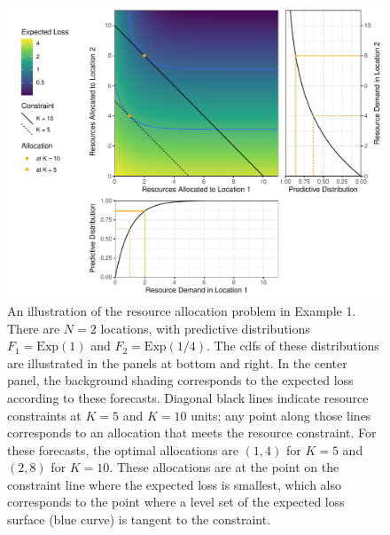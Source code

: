 \documentclass{article}
\begin{document}
\begin{figure}
    \includegraphics[width=\textwidth]{../figures/exponential_pred_expected_loss.pdf}
    \caption{An illustration of the resource allocation problem in Example 1. There are $N = 2$ locations, with predictive distributions $F_1 = \mathrm{Exp}(1)$ and $F_2 = \mathrm{Exp}(1/4)$. The cdfs of these distributions are illustrated in the panels at bottom and right. In the center panel, the background shading corresponds to the expected loss according to these forecasts. Diagonal black lines indicate resource constraints at $K=5$ and $K=10$ units; any point along those lines corresponds to an allocation that meets the resource constraint. For these forecasts, the optimal allocations are $(1, 4)$ for $K=5$ and $(2, 8)$ for $K=10$. These allocations are at the point on the constraint line where the expected loss is smallest, which also corresponds to the point where a level set of the expected loss surface (blue curve) is tangent to the constraint.}
    \label{fig:exp_alloc_example}
\end{figure}
\end{document}
